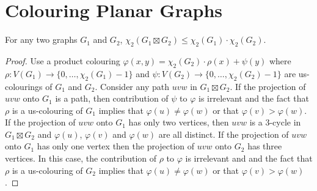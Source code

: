 \documentclass[kpfonts]{patmorin}
\newcommand{\uqs}{\chi_2}
\begin{document}
%
%
%
%
%
%

\section{Colouring Planar Graphs}

\begin{lem}
    For any two graphs $G_1$ and $G_2$, $\uqs(G_1\boxtimes G_2)\le \uqs(G_1)\cdot\uqs(G_2)$.
\end{lem}

\begin{proof}
  Use a product colouring $\varphi(x,y)=\uqs(G_2)\cdot \rho(x) + \psi(y)$ where $\rho:V(G_1)\to\{0,\ldots,\uqs(G_1)-1\}$ and $\psi:V(G_2)\to\{0,\ldots,\uqs(G_2)-1\}$ are us-colourings of $G_1$ and $G_2$.  Consider any path $uvw$ in $G_1\boxtimes G_2$.  If the projection of $uvw$ onto $G_1$ is a path, then contribution of $\psi$ to $\varphi$ is irrelevant and the fact that $\rho$ is a us-colouring of $G_1$ implies that $\varphi(u)\neq \varphi(w)$ or that $\varphi(v)>\varphi(w)$.  If the projection of $uvw$ onto $G_1$ has only two vertices, then $uvw$ is a $3$-cycle in $G_1\boxtimes G_2$ and $\varphi(u)$, $\varphi(v)$ and $\varphi(w)$ are all distinct.  If the projection of $uvw$ onto $G_1$ has only one vertex then the projection of $uvw$ onto $G_2$ has three vertices.  In this case, the contribution of $\rho$ to $\varphi$ is irrelevant and  and the fact that $\rho$ is a us-colouring of $G_2$ implies that $\varphi(u)\neq \varphi(w)$ or that $\varphi(v)>\varphi(w)$.
\end{proof}
\end{document}
